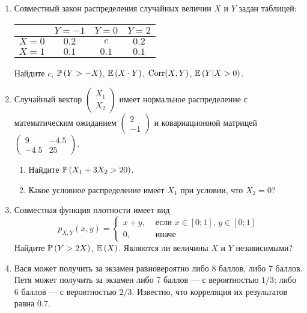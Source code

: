 \begin{enumerate}
\item Совместный закон распределения случайных величин  $X$  и  $Y$
задан таблицей:

\begin{center}
\begin{tabular}{@{}cccc@{}}
\toprule
    & $Y=-1$ & $Y=0$ & $Y=2$ \\ \midrule
$X=0$ & $0.2$  & $c$   & $0.2$ \\
$X=1$ & $0.1$  & $0.1$ & $0.1$ \\ \bottomrule
\end{tabular}
\end{center}

Найдите $c$, $\P\left(Y>-X\right)$, $\E\left(X\cdot Y \right)$, $\Corr(X,Y)$,
$\E\left(Y|X>0\right)$.

\item Случайный вектор  $\left(\begin{array}{c}
{X_{1} } \\ {X_{2} }
\end{array}\right)$  имеет нормальное распределение с
математическим ожиданием  $\left(\begin{array}{c} {2} \\ {-1}
\end{array}\right)$  и ковариационной матрицей
$\left(\begin{array}{cc} {9} & {-4.5} \\ {-4.5} & {25}
\end{array}\right)$.
\begin{enumerate}
\item Найдите  $\P\left(X_{1} +3X_{2} >20\right)$.
\item Какое условное распределение имеет $X_{1}$ при условии, что $X_{2}=0$?
\end{enumerate}

\item Совместная функция плотности имеет вид
\[
p_{X,Y} \left(x,y\right)=
\begin{cases}
x+y, & \text{ если } x\in \left[0;1\right],\, y\in \left[0;1\right] \\
0, & \text{ иначе}
\end{cases}
\]
Найдите  $\P\left(Y>2X\right)$, $\E\left(X\right)$. Являются ли величины $X$ и $Y$
независимыми?

\item Вася может получить за экзамен равновероятно либо 8 баллов, либо 7 баллов.
Петя может получить за экзамен либо 7 баллов — с вероятностью $1/3$; либо 6 баллов —
с вероятностью $2/3$. Известно, что корреляция их результатов равна $0.7$.


\end{enumerate}
